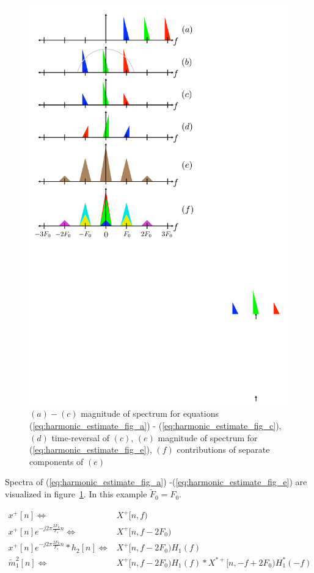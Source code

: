\documentclass [11pt, proquest,oneside] {ganter_thesis}[2015/03/03]
\begin{document}
\begin{figure}[!ht]
  \centering
    \includegraphics[width=.62\textwidth]{harmonic_envelope_estimate} 
        \caption{$(a)-(c)$ magnitude of spectrum for equations (\ref{eq:harmonic_estimate_fig_a}) - (\ref{eq:harmonic_estimate_fig_c}), $(d)$ time-reversal of $(c)$, $(e)$ magnitude of spectrum for (\ref{eq:harmonic_estimate_fig_e}), $(f)$ contributions of separate components of $(e)$}\label{fig:harmonic_envelope_estimate}
\end{figure}

Spectra of (\ref{eq:harmonic_estimate_fig_a}) -(\ref{eq:harmonic_estimate_fig_e}) are visualized in figure~\ref{fig:harmonic_envelope_estimate}.  In this example $\tilde{F}_0 = F_0$.

\begin{align}
\label{eq:harmonic_estimate_fig_a}
x^+[n] \Longleftrightarrow& X^+[n,f) \\
%
x^+[n]e^{-j2\pi \frac{2F_0}{F_s}n} \Longleftrightarrow& X^+[n,f - 2F_0) \\
%
\label{eq:harmonic_estimate_fig_c}
x^+[n]e^{-j2\pi \frac{2F_0}{F_s}n} * h_2[n] \Longleftrightarrow& X^+[n,f - 2F_0) H_1(f) \\
%
\label{eq:harmonic_estimate_fig_e}
\tilde{m}_1^2[n] \Longleftrightarrow& X^+[n,f - 2F_0) H_1(f) * X^{*+}[n,-f + 2F_0) H_1^*(-f)
\end{align}
\end{document}
